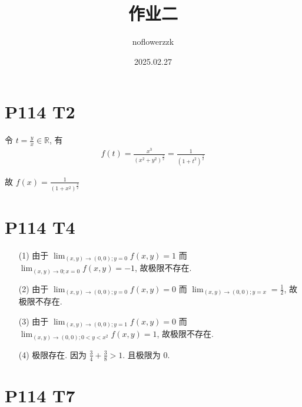 \documentclass{article}
\title{作业二}
\author{noflowerzzk}
\date{2025.02.27}
\begin{document}
\maketitle

\section*{P114 T2}

令 $t = \frac{y}{x} \in \mathbb{R}$, 有 
\begin{align*}
    f(t) = \frac{x^3}{\left(x^2 + y^2\right)^\frac{3}{2}} = \frac{1}{\left(1 + t^2\right)^\frac{3}{2}}
\end{align*}

故 $f(x) = \frac{1}{\left(1 + x^2\right)^\frac{3}{2}}$

\section*{P114 T4}

\begin{itemize}
    \item [(1)]
    由于 $\lim_{(x, y) \to (0, 0); y = 0}f(x, y) = 1$ 而 $\lim_{(x, y) \to 0; x = 0}f(x, y) = -1$, 故极限不存在.
    \item [(2)]
    由于 $\lim_{(x, y) \to (0, 0); y = 0}f(x, y) = 0$ 而 $\lim_{(x, y) \to (0, 0); y = x} = \frac{1}{2}$, 故极限不存在.
    \item [(3)]
    由于 $\lim_{(x, y) \to (0, 0); y = 1}f(x, y) = 0$ 而 $\lim_{(x, y) \to (0, 0); 0 < y < x^2} f(x, y) = 1$, 故极限不存在.
    \item [(4)]
    极限存在. 因为 $\frac{3}{4} + \frac{3}{8} > 1$. 且极限为 0.
\end{itemize}

\section*{P114 T7}
\end{document}
